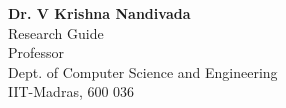 \vspace{-\parskip}
\begingroup
\singlespacing
\begin{flushright}
\textbf{Dr. V Krishna Nandivada}    \\
Research Guide        \\
Professor               \\
Dept. of Computer Science and Engineering  \\
IIT-Madras, 600 036             \\

\end{flushright}
\endgroup
\par
